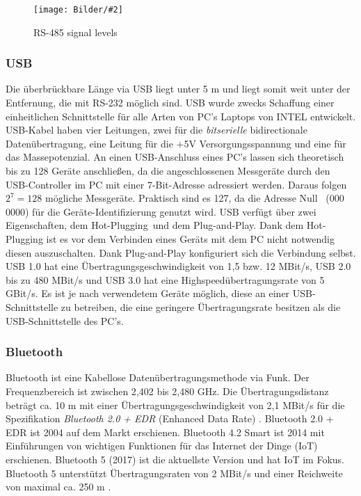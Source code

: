 \documentclass[
fontsize=12pt, 
paper=a4, 
BCOR=10mm, 
twoside=false,
 DIV=10, 
 headsepline, 
 footsepline
 ]{scrartcl}
\def\bild#1#2#3#4#5#6{%
\begin{figure}[h!] %
\centering
\texttt{[image: Bilder/\#2]}
\vspace{#3}
\caption[#4]{#5}\label{#6}
\end{figure}
}
\begin{document}
\bild{1}
{RS-485.png}
{0em}
{RS-485 signal levels}
{RS-485 signal levels \cite[S. 226]{hughes2010real}}
{RS-485}

\subsubsection{USB}

Die überbrückbare Länge via USB liegt unter 5 m und liegt somit weit unter der Entfernung, die mit RS-232 möglich sind. USB wurde zwecks Schaffung einer einheitlichen Schnittstelle für alle Arten von PC's Laptops von INTEL entwickelt. USB-Kabel haben vier Leitungen, zwei für die \textit{bitserielle} bidirectionale Datenübertragung, eine Leitung für die +5V Versorgungsspannung und eine für das Massepotenzial. An einen USB-Anschluss eines PC's lassen sich theoretisch bis zu 128 Geräte anschließen, da die angeschlossenen Messgeräte durch den USB-Controller im PC mit einer 7-Bit-Adresse adressiert werden. Daraus folgen $2^7=128$ mögliche Messgeräte. Praktisch sind es 127, da die Adresse \glqq Null \grqq \, (000 0000) für die Geräte-Identifizierung genutzt wird. USB verfügt über zwei Eigenschaften, dem \glqq Hot-Plugging\grqq \, und dem \glqq Plug-and-Play\grqq . Dank dem Hot-Plugging ist es vor dem Verbinden eines Geräts mit dem PC nicht notwendig diesen auszuschalten. Dank Plug-and-Play konfiguriert sich die Verbindung selbst. USB 1.0 hat eine Übertragungsgeschwindigkeit von 1,5 bzw. 12 MBit/s, USB 2.0 bis zu 480 MBit/s und USB 3.0 hat eine Highspeedübertragungsrate von 5 GBit/s. Es ist je nach verwendetem Geräte möglich, diese an einer USB-Schnittstelle zu betreiben, die eine geringere Übertragungsrate besitzen als die USB-Schnittstelle des PC's.

\subsubsection{Bluetooth}

Bluetooth ist eine Kabellose Datenübertragungsmethode via Funk. Der Frequenzbereich ist zwischen 2,402 bis 2,480 GHz. Die Übertragungsdistanz beträgt ca. 10 m mit einer Übertragungsgeschwindigkeit von 2,1 MBit/s für die Spezifikation \textit{Bluetooth 2.0 + EDR} (Enhanced Data Rate) \cite[S. 481 f.]{Busch2015}.
Bluetooth 2.0 + EDR ist 2004 auf dem Markt erschienen. Bluetooth 4.2 Smart ist 2014 mit Einführungen von wichtigen Funktionen für das Internet der Dinge (IoT) erschienen. Bluetooth 5 (2017) ist die aktuellste Version und hat IoT im Fokus. Bluetooth 5 unterstützt Übertragungsraten von 2 MBit/s und einer Reichweite von maximal ca. 250 m \cite{bt5}.\\
\end{document}

